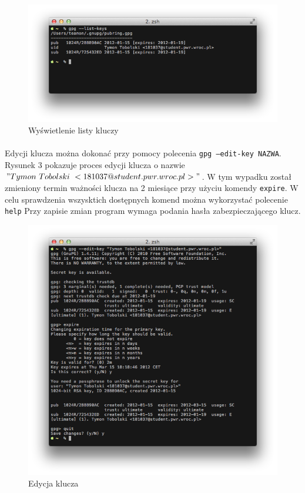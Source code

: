 \documentclass[wide,a4paper,titlepage,12pt] {article}
\begin{document}
  \begin{figure}[h!]
    \begin{center}
      \includegraphics[width=\textwidth]{img/2.png}
      \caption{Wyświetlenie listy kluczy}
    \end{center}
  \end{figure}

  \paragraph{}
  Edycji klucza można dokonać przy pomocy polecenia \texttt{gpg --edit-key NAZWA}. Rysunek 3 pokazuje proces edycji klucza o nazwie $"Tymon\ Tobolski\ <181037@student.pwr.wroc.pl>"$. W tym wypadku został zmieniony termin ważności klucza na 2 miesiące przy użyciu komendy \texttt{expire}. W celu sprawdzenia wszysktich dostępnych komend można wykorzystać polecenie \texttt{help} Przy zapisie zmian program wymaga podania hasła zabezpieczającego klucz.


  \begin{figure}[h!]
    \begin{center}
      \includegraphics[width=\textwidth]{img/3.png}
      \caption{Edycja klucza}
    \end{center}
  \end{figure}
\end{document}
